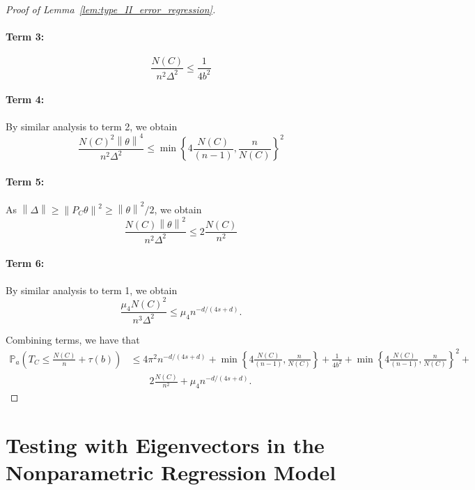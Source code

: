 \documentclass{article}
\newcommand{\norm}[1]{\left\lVert#1\right\rVert}
\newcommand{\set}[1]{\left\{#1\right\}}
\newcommand{\1}{\mathbb{I}}
\newcommand{\Pbb}{\mathbb{P}}
\theoremstyle{alden}
\theoremstyle{aldenthm}
\theoremstyle{definition}
\theoremstyle{remark}
\begin{document}
\begin{proof}[Proof of Lemma~\ref{lem:type_II_error_regression}]
\paragraph{Term 3:}
\begin{equation*}
\frac{N(C)}{n^2 \Delta^2} \leq \frac{1}{4b^2}
\end{equation*}

\paragraph{Term 4:}
By similar analysis to term 2, we obtain
\begin{equation*}
\frac{N(C)^2 \norm{\theta}^4}{n^2 \Delta^2} \leq \min \set{ 4 \frac{N(C)}{(n - 1)} , \frac{n}{N(C)} }^2
\end{equation*}

\paragraph{Term 5:}
As $\norm{\Delta} \geq \norm{P_C\theta}^2 \geq \norm{\theta}^2/2$, we obtain
\begin{equation*}
\frac{N(C) \norm{\theta}^2}{n^2 \Delta^2} \leq 2 \frac{N(C)}{n^2}
\end{equation*}

\paragraph{Term 6:}
By similar analysis to term 1, we obtain
\begin{equation*}
\frac{\mu_4N(C)^2}{n^3\Delta^2} \leq \mu_4n^{-d/(4s + d)}.
\end{equation*}

Combining terms, we have that 
\begin{align*}
\Pbb_a\left(T_C \leq \frac{N(C)}{n} + \tau(b) \right) & \leq 4\pi^2n^{-d/(4s+d)} + \min \set{ 4 \frac{N(C)}{(n - 1)} , \frac{n}{N(C)} } + \frac{1}{4b^2} + \min \set{ 4 \frac{N(C)}{(n - 1)} , \frac{n}{N(C)} }^2 + \\ 
& \quad \quad 2 \frac{N(C)}{n^2} + \mu_4n^{-d/(4s + d)}.
\end{align*}
\end{proof}

\section{Testing with Eigenvectors in the Nonparametric Regression Model}
\end{document}
